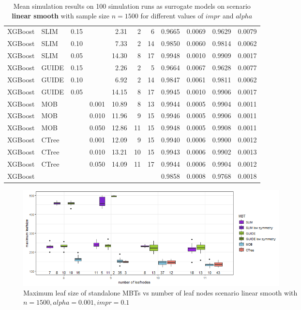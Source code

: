\begin{table}[!htb]
\begin{tabular}[t]{l|l|r|r|r|r|r|r|r|r|r}
XGBoost & SLIM & 0.15 & & 2.31 & 2 & 6 & 0.9665 & 0.0069 & 0.9629 & 0.0079\\
XGBoost & SLIM & 0.10 & & 7.33 & 2 & 14 & 0.9850 & 0.0060 & 0.9814 & 0.0062\\
XGBoost & SLIM & 0.05 & & 14.30 & 8 & 17 & 0.9948 & 0.0010 & 0.9909 & 0.0017\\
XGBoost & GUIDE & 0.15 & & 2.26 & 2 & 5 & 0.9664 & 0.0067 & 0.9628 & 0.0077\\
XGBoost & GUIDE & 0.10 & & 6.92 & 2 & 14 & 0.9847 & 0.0061 & 0.9811 & 0.0062\\
XGBoost & GUIDE & 0.05 & & 14.15 & 8 & 17 & 0.9945 & 0.0010 & 0.9906 & 0.0017\\
XGBoost & MOB & & 0.001 & 10.89 & 8 & 13 & 0.9944 & 0.0005 & 0.9904 & 0.0011\\
XGBoost & MOB & & 0.010 & 11.96 & 9 & 15 & 0.9946 & 0.0005 & 0.9906 & 0.0011\\
XGBoost & MOB & & 0.050 & 12.86 & 11 & 15 & 0.9948 & 0.0005 & 0.9908 & 0.0011\\
XGBoost & CTree & & 0.001 & 12.09 & 9 & 15 & 0.9940 & 0.0006 & 0.9900 & 0.0012\\
XGBoost & CTree & & 0.010 & 13.21 & 10 & 15 & 0.9943 & 0.0006 & 0.9902 & 0.0013\\
XGBoost & CTree & & 0.050 & 14.09 & 11 & 17 & 0.9944 & 0.0006 & 0.9904 & 0.0012\\
\hline
XGBoost &  & & &  &  &  & 0.9858 & 0.0008 & 0.9768 & 0.0018\\
\hline
\end{tabular}
\caption{Mean simulation results on 100 simulation runs as surrogate models on scenario \textbf{linear smooth} with sample size $n = 1500$ for different values of $impr$ and $alpha$}
\label{tab:app_linear_smooth_1000}
\end{table}


\begin{figure}[!htb]
     \centering
    \includegraphics[width=14cm]{Figures/simulations/batchtools/basic_scenarios/linear_smooth/ls_1000_standalone_symmetrie.png}
    \caption{Maximum leaf size of standalone MBTs vs number of leaf nodes scenario linear smooth with $n=1500, alpha = 0.001, impr = 0.1$}
\label{fig:app_ls_1000_standalone_symmetrie}
\end{figure} 


